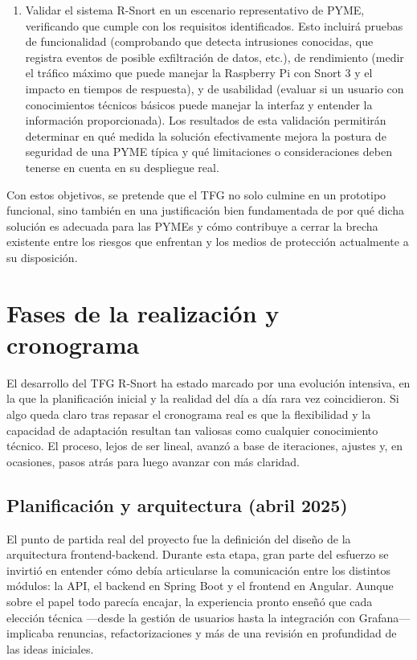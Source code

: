 \documentclass[11pt,a4paper,twoside]{report}
\begin{document}
\begin{enumerate}
	\item Validar el sistema R-Snort en un escenario representativo de PYME, verificando que cumple con los requisitos identificados. Esto incluirá pruebas de funcionalidad (comprobando que detecta intrusiones conocidas, que registra eventos de posible exfiltración de datos, etc.), de rendimiento (medir el tráfico máximo que puede manejar la Raspberry Pi con Snort 3 y el impacto en tiempos de respuesta), y de usabilidad (evaluar si un usuario con conocimientos técnicos básicos puede manejar la interfaz y entender la información proporcionada). Los resultados de esta validación permitirán determinar en qué medida la solución efectivamente mejora la postura de seguridad de una PYME típica y qué limitaciones o consideraciones deben tenerse en cuenta en su despliegue real.
\end{enumerate}

Con estos objetivos, se pretende que el TFG no solo culmine en un prototipo funcional, sino también en una justificación bien fundamentada de por qué dicha solución es adecuada para las PYMEs y cómo contribuye a cerrar la brecha existente entre los riesgos que enfrentan y los medios de protección actualmente a su disposición.


\section{Fases de la realización y cronograma}

El desarrollo del TFG R-Snort ha estado marcado por una evolución intensiva, en la que la planificación inicial y la realidad del día a día rara vez coincidieron. Si algo queda claro tras repasar el cronograma real es que la flexibilidad y la capacidad de adaptación resultan tan valiosas como cualquier conocimiento técnico. El proceso, lejos de ser lineal, avanzó a base de iteraciones, ajustes y, en ocasiones, pasos atrás para luego avanzar con más claridad.

\subsection{Planificación y arquitectura (abril 2025)}

El punto de partida real del proyecto fue la definición del diseño de la arquitectura frontend-backend. Durante esta etapa, gran parte del esfuerzo se invirtió en entender cómo debía articularse la comunicación entre los distintos módulos: la API, el backend en Spring Boot y el frontend en Angular. Aunque sobre el papel todo parecía encajar, la experiencia pronto enseñó que cada elección técnica —desde la gestión de usuarios hasta la integración con Grafana— implicaba renuncias, refactorizaciones y más de una revisión en profundidad de las ideas iniciales.
\end{document}
